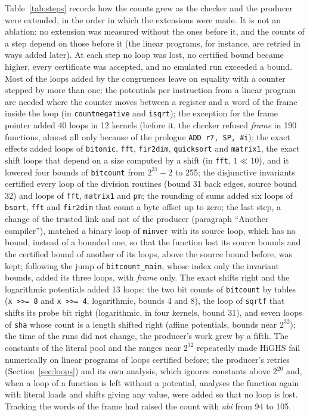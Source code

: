 \documentclass[oneside,english]{amsart}
\numberwithin{equation}{section}
\theoremstyle{plain}
\theoremstyle{definition}
\theoremstyle{plain}
\theoremstyle{plain}
\theoremstyle{remark}
\begin{document}
Table~\ref{tab:steps} records how the counts grew as the checker and the producer were extended, in the order in which the extensions were made. It is not an ablation: no extension was measured without the ones before it, and the counts of a step depend on those before it (the linear programs, for instance, are retried in ways added later). At each step no loop was lost, no certified bound became higher, every certificate was accepted, and no emulated run exceeded a bound. Most of the loops added by the congruences leave on equality with a counter stepped by more than one; the potentials per instruction from a linear program are needed where the counter moves between a register and a word of the frame inside the loop (in \texttt{countnegative} and \texttt{isqrt}); the exception for the frame pointer added 40 loops in 12 kernels (before it, the checker refused \emph{frame} in 190 functions, almost all only because of the prologue \texttt{ADD r7, SP, \#i}); the exact effects added loops of \texttt{bitonic}, \texttt{fft}, \texttt{fir2dim}, \texttt{quicksort} and \texttt{matrix1}, the exact shift loops that depend on a size computed by a shift (in \texttt{fft}, $1 \ll 10$), and it lowered four bounds of \texttt{bitcount} from $2^{31} - 2$ to 255; the disjunctive invariants certified every loop of the division routines (bound 31 back edges, source bound 32) and loops of \texttt{fft}, \texttt{matrix1} and \texttt{pm}; the rounding of sums added six loops of \texttt{bsort}, \texttt{fft} and \texttt{fir2dim} that count a byte offset up to zero; the last step, a change of the trusted link and not of the producer (paragraph ``Another compiler''), matched a binary loop of \texttt{minver} with its source loop, which has no bound, instead of a bounded one, so that the function lost its source bounds and the certified bound of another of its loops, above the source bound before, was kept; following the jump of \texttt{bitcount\_main}, whose index only the invariant bounds, added its three loops, with \emph{frame} only. The exact shifts right and the logarithmic potentials added 13 loops: the two bit counts of \texttt{bitcount} by tables (\texttt{x >>= 8} and \texttt{x >>= 4}, logarithmic, bounds 4 and 8), the loop of \texttt{sqrtf} that shifts its probe bit right (logarithmic, in four kernels, bound 31), and seven loops of \texttt{sha} whose count is a length shifted right (affine potentials, bounds near $2^{32}$); the time of the runs did not change, the producer's work grew by a fifth. The constants of the literal pool and the ranges near $2^{32}$ repeatedly made HiGHS fail numerically on linear programs of loops certified before; the producer's retries (Section~\ref{sec:loops}) and its own analysis, which ignores constants above $2^{20}$ and, when a loop of a function is left without a potential, analyses the function again with literal loads and shifts giving any value, were added so that no loop is lost. Tracking the words of the frame had raised the count with \emph{abi} from 94 to 105.
\end{document}
